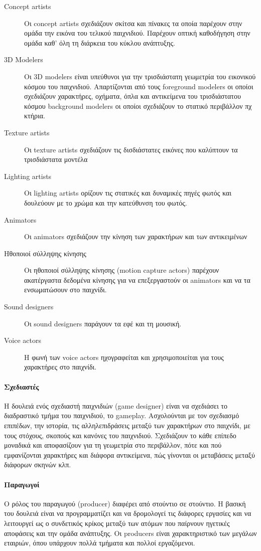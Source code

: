 	\begin{description}
		\item [Concept artists] 
		Οι concept artists σχεδιάζουν σκίτσα και πίνακες τα οποία παρέχουν στην ομάδα την εικόνα του τελικού παιχνιδιού. Παρέχουν οπτική καθοδήγηση στην ομάδα καθ' όλη τη διάρκεια του κύκλου ανάπτυξης.
		\item [3D Modelers]
	    Οι 3D modelers είναι υπεύθυνοι για την τρισδιάστατη γεωμετρία του εικονικού κόσμου του παιχνιδιού. Απαρτίζονται από τους
		foreground modelers οι οποίοι σχεδιάζουν χαρακτήρες, οχήματα, όπλα και αντικείμενα του τρισδιάστατου κόσμου
		background modelers οι οποίοι σχεδιάζουν το στατικό περιβάλλον πχ κτήρια.
		\item [Texture artists] Οι texture artists σχεδιάζουν τις δισδιάστατες εικόνες που καλύπτουν τα τρισδιάστατα μοντέλα
		\item [Lighting artists] Οι lighting artists ορίζουν τις στατικές και δυναμικές πηγές φωτός και δουλεύουν με το χρώμα και την κατεύθυνση του φωτός.
		\item [Animators] Οι animators σχεδιάζουν την κίνηση των χαρακτήρων και των αντικειμένων
		\item [Hθοποιοί σύλληψης κίνησης] Οι ηθοποιοί σύλληψης κίνησης (motion capture actors) παρέχουν ακατέργαστα δεδομένα κίνησης για να επεξεργαστούν οι animators και να τα ενσωματώσουν στο παιχνίδι.
		\item [Sound designers] Οι sound designers παράγουν τα εφέ και τη μουσική.
		\item [Voice actors] H φωνή των voice actors ηχογραφείται και χρησιμοποιείται για τους χαρακτήρες στο παιχνίδι.
	\end{description}
	
	\paragraph{Σχεδιαστές}
	Η δουλειά ενός σχεδιαστή παιχνιδιών (game designer) είναι να σχεδιάσει το διαδραστικό τμήμα του παιχνιδιού, το gameplay. Ασχολούνται με τον σχεδιασμό επιπέδων, την ιστορία, τις αλληλεπιδράσεις μεταξύ των χαρακτήρων στο παιχνίδι, με τους στόχους, σκοπούς και κανόνες του παιχνιδιού.
	Σχεδιάζουν το κάθε επίπεδο μοναδικά και αποφασίζουν για τη γεωμετρία στο περιβάλλον, πότε και πού εμφανίζονται χαρακτήρες και διάφορα αντικείμενα, πώς γίνονται οι μεταβάσεις μεταξύ διάφορων σκηνών κλπ.
	
	\paragraph{Παραγωγοί}
	Ο ρόλος του παραγωγού (producer) διαφέρει από στούντιο σε στούντιο. Η βασική του δουλειά είναι να προγραμματίζει και να δρομολογεί τις διάφορες εργασίες και να λειτουργεί ως ο συνδετικός κρίκος μεταξύ των ατόμων που παίρνουν ηγετικές αποφάσεις και την ομάδα ανάπτυξης. Οι producers είναι χαρακτηριστικό των μεγάλων εταιριών, όπου υπάρχουν πολλά τμήματα και πολλοί εργαζόμενοι.	
	
